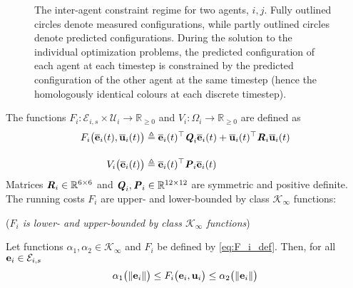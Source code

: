 \begin{figure}[ht!]
  \centering
  
  \caption{The inter-agent constraint regime for two agents, $i,j$. Fully
    outlined circles denote measured configurations, while partly outlined
    circles denote predicted configurations. During the solution to the
    individual optimization problems, the predicted configuration of each agent
    at each timestep is constrained by the predicted configuration of the other
    agent at the same timestep (hence the homologously identical colours at
    each discrete timestep).}
  \label{fig:constraint_regime_horizon}
\end{figure}


The functions
$F_i : \mathcal{E}_{i,s} \times \mathcal{U}_i \to \mathbb{R}_{\geq 0}$ and
$V_i: \Omega_i \to \mathbb{R}_{\geq 0}$ are defined as
\begin{align}
  F_i \big(\overline{\bm{\mathbf{e}}}_i(t), \overline{\bm{\mathbf{u}}}_i(t)\big)
    &\triangleq \overline{\bm{\mathbf{e}}}_i(t)^{\top} \bm{\mathit{Q}}_i \overline{\bm{\mathbf{e}}}_i(t)
  + \overline{\bm{\mathbf{u}}}_i(t)^{\top} \bm{\mathit{R}}_i \overline{\bm{\mathbf{u}}}_i(t) \label{eq:F_i_def} \\[2.5ex]
  V_i \big(\overline{\bm{\mathbf{e}}}_i(t)\big) & \triangleq \overline{\bm{\mathbf{e}}}_i(t)^{\top} \bm{\mathit{P}}_i \overline{\bm{\mathbf{e}}}_i(t) \label{eq:V_i_def}
\end{align}
Matrices $\bm{\mathit{R}}_i \in \mathbb{R}^{6 \times 6}$ and
$\bm{\mathit{Q}}_i, \bm{\mathit{P}}_i \in \mathbb{R}^{12 \times 12}$ are symmetric and positive
definite.  The running costs $F_i$ are upper- and lower-bounded by class
$\mathcal{K}_{\infty}$ functions:

\begin{bw_box}
  \begin{lemma} (\textit{$F_i$ is lower- and upper-bounded by class $\mathcal{K}_{\infty}$ functions})
    \label{lemma:F_i_bounded_K_class}

    Let functions $\alpha_1, \alpha_2 \in \mathcal{K}_{\infty}$ and $F_i$
    be defined by \eqref{eq:F_i_def}. Then, for all
    $\bm{\mathbf{e}}_i \in \mathcal{E}_{i,s}$
    \begin{align}
      \alpha_1\big(\|\bm{\mathbf{e}}_i\|\big) \leq F_i\big(\bm{\mathbf{e}}_i, \bm{\mathbf{u}}_i\big) \leq \alpha_2\big(\| \bm{\mathbf{e}}_i \|\big)
    \end{align}
  \end{lemma}
\end{bw_box}


